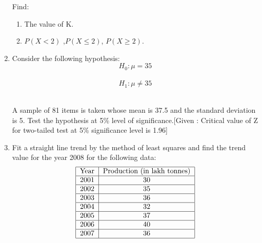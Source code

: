 \documentclass[a4paper,12pt]{article}
\begin{document}
\begin{enumerate}
Find:\
\begin{enumerate}
\item The value of K.
\item $P(X< 2)$ ,$P(X \leq 2)$, $P(X \geq 2)$.
\end{enumerate}

\item Consider the following hypothesis: \
$$H_0: \mu = 35$$\
$$H_1: \mu \neq 35$$\

A sample of 81 items is taken whose mean is 37.5 and the standard deviation is 5. Test the hypothesis at 5\% level of significance.[Given : Critical value of Z for two-tailed test at 5\% significance level is 1.96]

\item Fit a straight line trend by the method of least squares and  find the trend value for the year 2008 for the following data:\\
$$\begin{tabular}{|c|c|}
\hline
Year & Production (in lakh tonnes) \\
\hline
2001 & 30 \\
\hline 
2002 & 35 \\
\hline 
2003 & 36 \\
\hline 
2004 & 32 \\
\hline 
2005 & 37 \\
\hline 
2006 & 40 \\
\hline 
2007 & 36 \\
\hline 
\end{tabular}$$

\end{enumerate}
\end{document}
